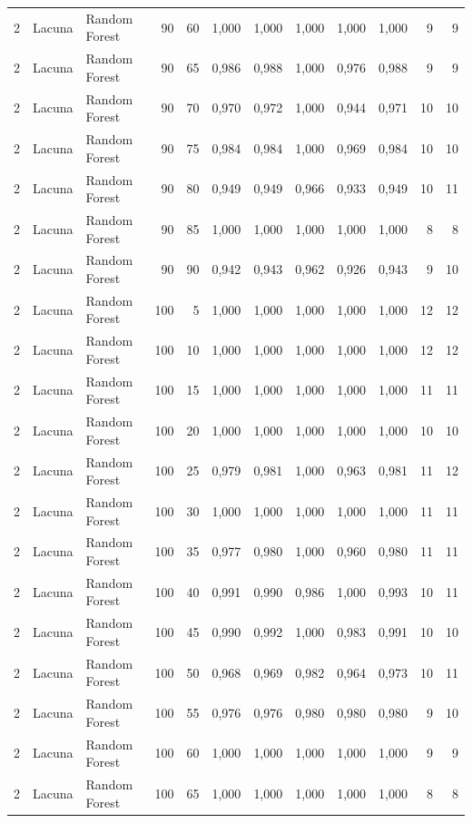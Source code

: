 \begin{longtable}{@{}rllrrrrrrrrr@{}}
2 & Lacuna & Random Forest & 90 & 60 & 1,000 & 1,000 & 1,000 & 1,000 & 1,000 & 9 & 9 \\
2 & Lacuna & Random Forest & 90 & 65 & 0,986 & 0,988 & 1,000 & 0,976 & 0,988 & 9 & 9 \\
2 & Lacuna & Random Forest & 90 & 70 & 0,970 & 0,972 & 1,000 & 0,944 & 0,971 & 10 & 10 \\
2 & Lacuna & Random Forest & 90 & 75 & 0,984 & 0,984 & 1,000 & 0,969 & 0,984 & 10 & 10 \\
2 & Lacuna & Random Forest & 90 & 80 & 0,949 & 0,949 & 0,966 & 0,933 & 0,949 & 10 & 11 \\
2 & Lacuna & Random Forest & 90 & 85 & 1,000 & 1,000 & 1,000 & 1,000 & 1,000 & 8 & 8 \\
2 & Lacuna & Random Forest & 90 & 90 & 0,942 & 0,943 & 0,962 & 0,926 & 0,943 & 9 & 10 \\
2 & Lacuna & Random Forest & 100 & 5 & 1,000 & 1,000 & 1,000 & 1,000 & 1,000 & 12 & 12 \\
2 & Lacuna & Random Forest & 100 & 10 & 1,000 & 1,000 & 1,000 & 1,000 & 1,000 & 12 & 12 \\
2 & Lacuna & Random Forest & 100 & 15 & 1,000 & 1,000 & 1,000 & 1,000 & 1,000 & 11 & 11 \\
2 & Lacuna & Random Forest & 100 & 20 & 1,000 & 1,000 & 1,000 & 1,000 & 1,000 & 10 & 10 \\
2 & Lacuna & Random Forest & 100 & 25 & 0,979 & 0,981 & 1,000 & 0,963 & 0,981 & 11 & 12 \\
2 & Lacuna & Random Forest & 100 & 30 & 1,000 & 1,000 & 1,000 & 1,000 & 1,000 & 11 & 11 \\
2 & Lacuna & Random Forest & 100 & 35 & 0,977 & 0,980 & 1,000 & 0,960 & 0,980 & 11 & 11 \\
2 & Lacuna & Random Forest & 100 & 40 & 0,991 & 0,990 & 0,986 & 1,000 & 0,993 & 10 & 11 \\
2 & Lacuna & Random Forest & 100 & 45 & 0,990 & 0,992 & 1,000 & 0,983 & 0,991 & 10 & 10 \\
2 & Lacuna & Random Forest & 100 & 50 & 0,968 & 0,969 & 0,982 & 0,964 & 0,973 & 10 & 11 \\
2 & Lacuna & Random Forest & 100 & 55 & 0,976 & 0,976 & 0,980 & 0,980 & 0,980 & 9 & 10 \\
2 & Lacuna & Random Forest & 100 & 60 & 1,000 & 1,000 & 1,000 & 1,000 & 1,000 & 9 & 9 \\
2 & Lacuna & Random Forest & 100 & 65 & 1,000 & 1,000 & 1,000 & 1,000 & 1,000 & 8 & 8 \\

\end{longtable}
